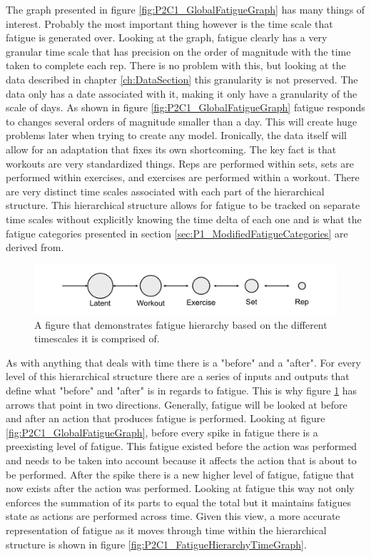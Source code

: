 The graph presented in figure \ref{fig:P2C1_GlobalFatigueGraph} has many things of interest. Probably the most important thing however is the time scale that fatigue is generated over. Looking at the graph, fatigue clearly has a very granular time scale that has precision on the order of magnitude with the time taken to complete each rep. There is no problem with this, but looking at the data described in chapter \ref{ch:DataSection} this granularity is not preserved. The data only has a date associated with it, making it only have a granularity of the scale of days. As shown in figure \ref{fig:P2C1_GlobalFatigueGraph} fatigue responds to changes several orders of magnitude smaller than a day. This will create huge problems later when trying to create any model. Ironically, the data itself will allow for an adaptation that fixes its own shortcoming. The key fact is that workouts are very standardized things. Reps are performed within sets, sets are performed within exercises, and exercises are performed within a workout. There are very distinct time scales associated with each part of the hierarchical structure. This hierarchical structure allows for fatigue to be tracked on separate time scales without explicitly knowing the time delta of each one and is what the fatigue categories presented in section \ref{sec:P1_ModifiedFatigueCategories} are derived from. 

\begin{figure}[htb]
    \centering
    \includegraphics[scale=0.55]{images/p2/ch1/FatigueHierarchy.png}
    \caption{A figure that demonstrates fatigue hierarchy based on the different timescales it is comprised of.}
    \label{fig:P2C1_FatigueHierarchyGraph}
\end{figure}

As with anything that deals with time there is a "before" and a "after". For every level of this hierarchical structure there are a series of inputs and outputs that define what "before" and "after" is in regards to fatigue. This is why figure \ref{fig:P2C1_FatigueHierarchyGraph} has arrows that point in two directions. Generally, fatigue will be looked at before and after an action that produces fatigue is performed. Looking at figure \ref{fig:P2C1_GlobalFatigueGraph}, before every spike in fatigue there is a preexisting level of fatigue. This fatigue existed before the action was performed and needs to be taken into account because it affects the action that is about to be performed. After the spike there is a new higher level of fatigue, fatigue that now exists after the action was performed. Looking at fatigue this way not only enforces the summation of its parts to equal the total but it maintains fatigues state as actions are performed across time. Given this view, a more accurate representation of fatigue as it moves through time within the hierarchical structure is shown in figure \ref{fig:P2C1_FatigueHierarchyTimeGraph}.

